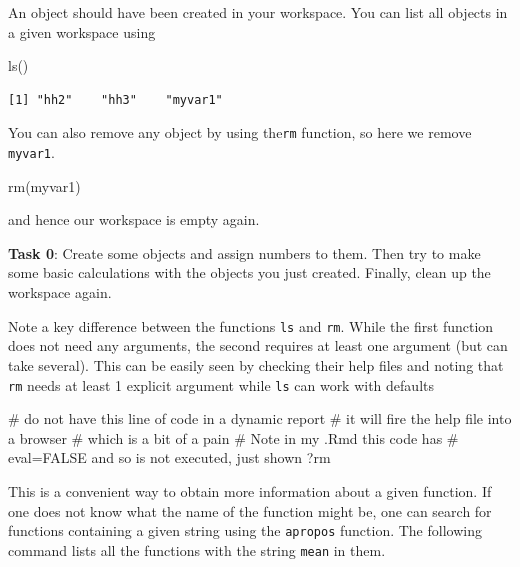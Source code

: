 \documentclass[
  letterpaper,
  DIV=11,
  numbers=noendperiod]{scrartcl}
\newenvironment{Shaded}{\begin{snugshade}}{\end{snugshade}}
\newcommand{\CommentTok}[1]{\textcolor[rgb]{0.37,0.37,0.37}{#1}}
\newcommand{\FunctionTok}[1]{\textcolor[rgb]{0.28,0.35,0.67}{#1}}
\newcommand{\NormalTok}[1]{\textcolor[rgb]{0.00,0.23,0.31}{#1}}
\begin{document}
An object should have been created in your workspace. You can list all
objects in a given workspace using

\begin{Shaded}
\begin{Highlighting}[]
\FunctionTok{ls}\NormalTok{()}
\end{Highlighting}
\end{Shaded}

\begin{verbatim}
[1] "hh2"    "hh3"    "myvar1"
\end{verbatim}

You can also remove any object by using the\texttt{rm} function, so here
we remove \texttt{myvar1}.

\begin{Shaded}
\begin{Highlighting}[]
\FunctionTok{rm}\NormalTok{(myvar1)}
\end{Highlighting}
\end{Shaded}

and hence our workspace is empty again.

\textbf{Task 0}: Create some objects and assign numbers to them. Then
try to make some basic calculations with the objects you just created.
Finally, clean up the workspace again.

Note a key difference between the functions \texttt{ls} and \texttt{rm}.
While the first function does not need any arguments, the second
requires at least one argument (but can take several). This can be
easily seen by checking their help files and noting that \texttt{rm}
needs at least 1 explicit argument while \texttt{ls} can work with
defaults

\begin{Shaded}
\begin{Highlighting}[]
\CommentTok{\# do not have this line of code in a dynamic report}
\CommentTok{\# it will fire the help file into a browser}
\CommentTok{\# which is a bit of a pain}
\CommentTok{\# Note in my .Rmd this code has}
\CommentTok{\# eval=FALSE and so is not executed, just shown}
\NormalTok{?rm}
\end{Highlighting}
\end{Shaded}

This is a convenient way to obtain more information about a given
function. If one does not know what the name of the function might be,
one can search for functions containing a given string using the
\texttt{apropos} function. The following command lists all the functions
with the string \texttt{mean} in them.
\end{document}
